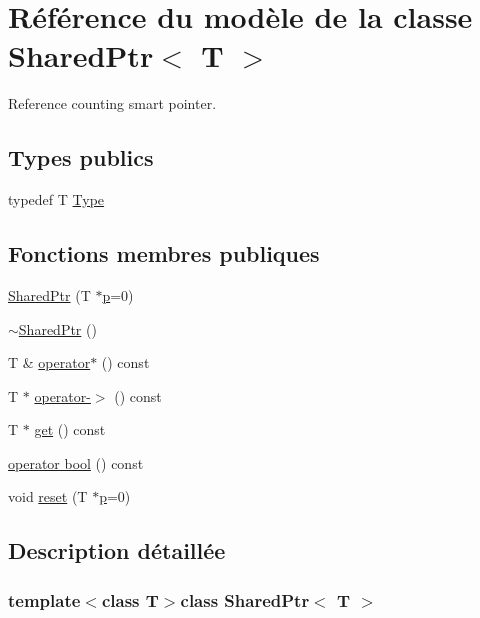 \hypertarget{class_shared_ptr}{}\section{Référence du modèle de la classe Shared\+Ptr$<$ T $>$}
\label{class_shared_ptr}


Reference counting smart pointer.  


\subsection*{Types publics}
\begin{DoxyCompactItemize}
\item 
typedef T \hyperlink{class_shared_ptr_a6f8522e4cfee9ec484fa9fec9a37d0f1}{Type}
\end{DoxyCompactItemize}
\subsection*{Fonctions membres publiques}
\begin{DoxyCompactItemize}
\item 
\hyperlink{class_shared_ptr_a7f00a1fb22e4d2a1b3cb55ec89d8dd99}{Shared\+Ptr} (T $\ast$\hyperlink{060__command__switch_8tcl_a15229b450f26d8fa1c10bea4f3279f4d}{p}=0)
\item 
\hyperlink{class_shared_ptr_ae587e1b0f76a90dfa14e0fa14a2f91ef}{$\sim$\+Shared\+Ptr} ()
\item 
T \& \hyperlink{class_shared_ptr_ab18d00fe94dfa00e2c5500f150231371}{operator$\ast$} () const 
\item 
T $\ast$ \hyperlink{class_shared_ptr_a0f2117389b16d211879312b8c13e840e}{operator-\/$>$} () const 
\item 
T $\ast$ \hyperlink{class_shared_ptr_ac747048e189c896c11f0b436d02fc5e1}{get} () const 
\item 
\hyperlink{class_shared_ptr_a8c6baf781f5067cd53c5f6326c533c6b}{operator bool} () const 
\item 
void \hyperlink{class_shared_ptr_a0b0f0066a893260cffd468be2e57aaea}{reset} (T $\ast$\hyperlink{060__command__switch_8tcl_a15229b450f26d8fa1c10bea4f3279f4d}{p}=0)
\end{DoxyCompactItemize}


\subsection{Description détaillée}
\subsubsection*{template$<$class T$>$class Shared\+Ptr$<$ T $>$}

